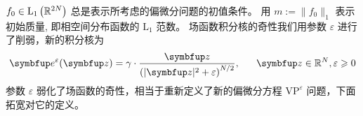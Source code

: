  $f_{0} \in \mathrm{L}_{1}\left({\mathbb{R}}^{2 N}\right)$ 总是表示所考虑的偏微分问题的初值条件。 用 $m:=\|f_{0}\|_{1}$ 表示初始质量, 即相空间分布函数的 $\mathrm{L}_1$ 范数。
场函数积分核的奇性我们用参数 $\varepsilon$ 进行了削弱，新的积分核为
$$\vect{e}^{\varepsilon}(\vect{z})=\gamma \cdot \frac{\vect{z}}{\left(|\vect{z}|^{2}+\varepsilon\right)^{N / 2}},~ \quad ~ \vect{z} \in \bbR^{N}, \varepsilon \geqslant 0$$
参数 $\varepsilon$ 弱化了场函数的奇性，相当于重新定义了新的偏微分方程 $\text{VP}^\varepsilon$ 问题，下面拓宽对它的定义。

